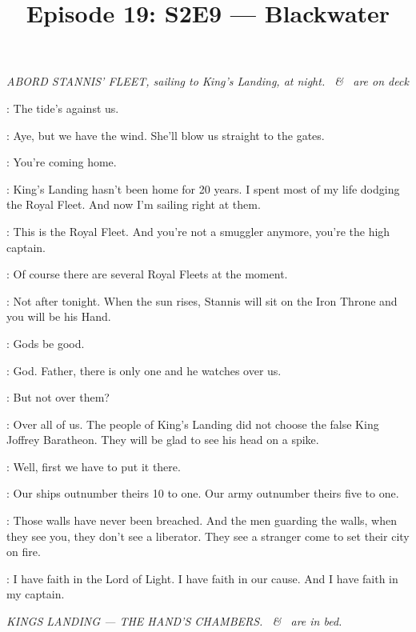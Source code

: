 

\title{Episode 19: S2E9 --- Blackwater}
\author{}
\date{}
\maketitle
\newcommand{\SGNS}{\textbf{SERVING GIRL}}
\newcommand{\SERI}{\textbf{SER ILYN}}




\scene

\textit{ABORD STANNIS' FLEET, sailing to King's Landing, at night. \MATTHOS ~\& \DAVOS ~are on deck} 

\MATTHOS: The tide's against us. 

\DAVOS: Aye, but we have the wind. 
She'll blow us straight to the gates. 

\MATTHOS: You're coming home. 

\DAVOS: King's Landing hasn't been home for 20 years. 
I spent most of my life dodging the Royal Fleet. 
And now I'm sailing right at them. 

\MATTHOS: This is the Royal Fleet. 
And you're not a smuggler anymore, you're the high captain. 

\DAVOS: Of course there are several Royal Fleets at the moment. 

\MATTHOS: Not after tonight. When the sun rises, Stannis will sit on the Iron Throne and you will be his Hand. 

\DAVOS: Gods be good. 

\MATTHOS: God. 
Father, there is only one and he watches over us. 

\DAVOS: But not over them? 

\MATTHOS: Over all of us. 
The people of King's Landing did not choose the false King Joffrey Baratheon. 
They will be glad to see his head on a spike. 

\DAVOS: Well, first we have to put it there. 

\MATTHOS: Our ships outnumber theirs 10 to one. 
Our army outnumber theirs five to one. 

\DAVOS: Those walls have never been breached. 
And the men guarding the walls, when they see you, they don't see a liberator. 
They see a stranger come to set their city on fire. 

\MATTHOS: I have faith in the Lord of Light. 
I have faith in our cause. 
And I have faith in my captain. 


\scene

\textit{KINGS LANDING --- THE HAND'S CHAMBERS. \TYRION ~\& \SHAE ~are in
bed.} 

